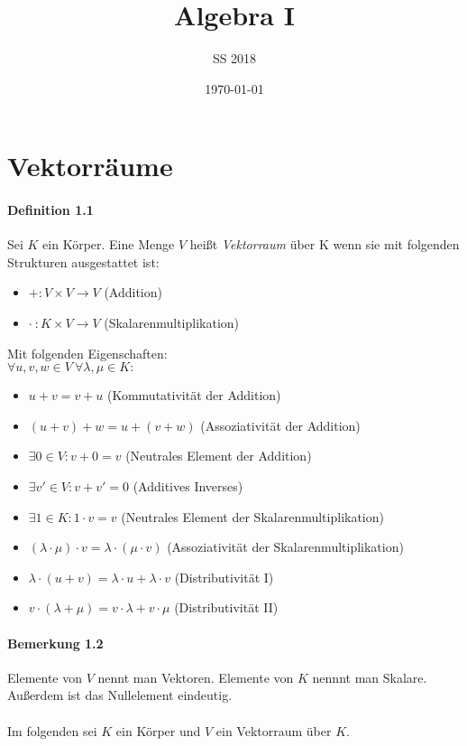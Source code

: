 \documentclass{scrartcl}
\begin{document}
\subject{Skriptum}
\title{Algebra I}
\subtitle{SS 2018}
\date{\today}
\maketitle

\tableofcontents

\section{Vektorräume}
\label{sec:vektorraeume}

\paragraph{Definition 1.1}
Sei $K$ ein Körper. Eine Menge $V$ heißt \textit{Vektorraum} über K wenn sie mit
folgenden Strukturen ausgestattet ist:
\begin{itemize}
\item $+ : V \times V \to V $ (Addition)
\item $\cdot~: K \times V \to V $ (Skalarenmultiplikation)
\end{itemize}
Mit folgenden Eigenschaften: \\
$\forall u,v,w \in V~\forall \lambda, \mu \in K :$
\begin{itemize}
\item $u + v = v + u$ (Kommutativität der Addition)
\item $(u + v) + w = u + (v + w)$ (Assoziativität der Addition)
\item $\exists 0 \in V: v + 0 = v$ (Neutrales Element der Addition)
\item $\exists v' \in V: v + v' = 0$ (Additives Inverses)
\item $\exists 1 \in K: 1 \cdot v = v$ (Neutrales Element der
  Skalarenmultiplikation) 
\item $(\lambda \cdot \mu) \cdot v = \lambda \cdot (\mu \cdot v)$
  (Assoziativität der Skalarenmultiplikation)
\item $\lambda \cdot (u + v) = \lambda \cdot u + \lambda \cdot v$
  (Distributivität I)
\item $v \cdot (\lambda + \mu) = v \cdot \lambda + v \cdot \mu$
  (Distributivität II)
\end{itemize}

\paragraph{Bemerkung 1.2}
Elemente von $V$ nennt man Vektoren. Elemente von $K$ nennnt man Skalare.
Außerdem ist das Nullelement eindeutig.
~\\\\
Im folgenden sei $K$ ein Körper und $V$ ein Vektorraum über $K$.
\end{document}
